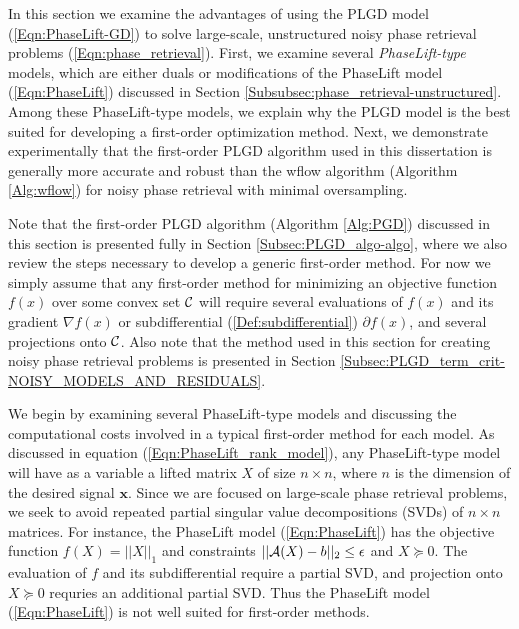 In this section we examine the advantages of using the PLGD model (\ref{Eqn:PhaseLift-GD}) to solve large-scale, unstructured noisy phase retrieval problems (\ref{Eqn:phase_retrieval}). 
First, we examine several \textit{PhaseLift-type} models, which are either duals or modifications of the PhaseLift model (\ref{Eqn:PhaseLift}) discussed in Section \ref{Subsubsec:phase_retrieval-unstructured}.
Among these PhaseLift-type models, we explain why the PLGD model is the best suited for developing a first-order optimization method.
Next, we demonstrate experimentally that the first-order PLGD algorithm used in this dissertation is generally more accurate and robust than the wflow algorithm (Algorithm \ref{Alg:wflow}) for noisy phase retrieval with minimal oversampling.

Note that the first-order PLGD algorithm (Algorithm \ref{Alg:PGD}) discussed in this section is presented fully in Section \ref{Subsec:PLGD_algo-algo}, where we also 
review the steps necessary to develop a generic first-order method.  
For now we simply assume that any first-order method for minimizing an objective function $f(x)$ over some convex set ${\mathcal C}$ will require several evaluations of $f(x)$ and its gradient $\nabla f(x)$ or subdifferential (\ref{Def:subdifferential}) $\partial f(x)$, and several projections onto ${\mathcal C}$.
Also note that the method used in this section for creating noisy phase retrieval problems is presented in Section \ref{Subsec:PLGD_term_crit-NOISY_MODELS_AND_RESIDUALS}.





We begin by examining several PhaseLift-type models and discussing the computational costs involved in a typical first-order method for each model.
As discussed in equation (\ref{Eqn:PhaseLift_rank_model}), any PhaseLift-type model will have as a variable a lifted matrix $X$ of size $n \times n$, where $n$ is the dimension of the desired signal $\mathbf{x}$.
Since we are focused on large-scale phase retrieval problems, we seek to avoid repeated partial singular value decompositions (SVDs) of $n \times n$ matrices.
For instance, the PhaseLift model (\ref{Eqn:PhaseLift}) has the objective function $f(X) = ||X||_1$ and constraints $||{\mathcal A}(X) - b||_2 \leq \epsilon$ and $X \succeq 0$.  
The evaluation of $f$ and its subdifferential require a partial SVD, and projection onto $X \succeq 0$ requries an additional partial SVD.
Thus the PhaseLift model (\ref{Eqn:PhaseLift}) is not well suited for first-order methods.

